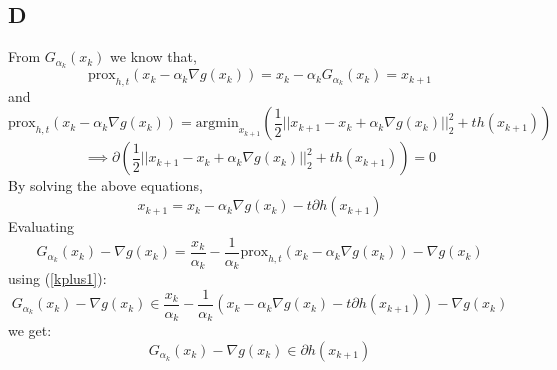 \documentclass{article}
\begin{document}
\subsection{D}
From $G_{\alpha_k}(x_k)$ we know that, 
$$
\mathrm{prox}_{h,t}(x_k-\alpha_k\nabla g(x_k)) =x_k-\alpha_k G_{\alpha_k}(x_k) =x_{k+1}
$$
and 
$$
\mathrm{prox}_{h,t}(x_k-\alpha_k\nabla g(x_k)) =\mathrm{argmin}_{x_{k+1}}(\frac{1}{2}||x_{k+1}-x_k+\alpha_k \nabla g(x_k)||^2_2+th(x_{k+1})) 
$$
$$
\implies \partial(\frac{1}{2}||x_{k+1}-x_k+\alpha_k \nabla g(x_k)||^2_2+th(x_{k+1})) =0
$$
By solving the above equations,
\begin{equation}\label{kplus1}
x_{k+1}=x_k-\alpha_k\nabla g(x_k) -t \partial h(x_{k+1})
\end{equation}
Evaluating
$$
G_{\alpha_k}(x_k)-\nabla g(x_k) = \frac{x_k}{\alpha_k}-\frac{1}{\alpha_k}\mathrm{prox}_{h,t}(x_k-\alpha_k\nabla g(x_k)) -\nabla g(x_k) 
$$
using (\ref{kplus1}):
$$
G_{\alpha_k}(x_k)-\nabla g(x_k)  \in  \frac{x_k}{\alpha_k} -\frac{1}{\alpha_k}(x_k-\alpha_k\nabla g(x_k) -t \partial h(x_{k+1}))
-\nabla g(x_k)
$$
we get:
$$
G_{\alpha_k}(x_k)-\nabla g(x_k)  \in  \partial h(x_{k+1})
$$



\end{document}
